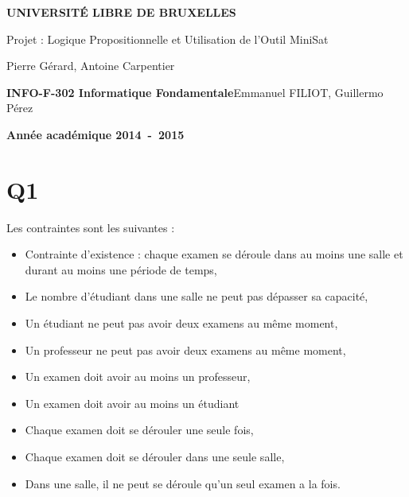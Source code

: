 \documentclass[a4paper,11pt]{article}
\begin{document}
\begin{titlepage}
\begin{center}
\textbf{\textsc{UNIVERSIT\'E LIBRE DE BRUXELLES}}\\
\vfill{}\vfill{}
\begin{center}{\Huge Projet : Logique Propositionnelle et Utilisation de l’Outil MiniSat}\end{center}{\Huge \par}
\begin{center}{\large Pierre Gérard, Antoine Carpentier}\end{center}{\Huge \par}
\vfill{}\vfill{} \vfill{}
\begin{flushleft}{\large \textbf{INFO-F-302 Informatique Fondamentale}}\hfill{Emmanuel FILIOT, Guillermo Pérez}\end{flushleft}{\large\par}
\vfill{}\vfill{}\enlargethispage{3cm}
\textbf{Année académique 2014~-~2015}
\end{center}
\end{titlepage}



\tableofcontents

\pagebreak


\section{Q1}
Les contraintes sont les suivantes :
\begin{itemize}
  \item Contrainte d'existence : chaque examen se déroule dans au moins une salle et durant au moins une période de temps,
  \item Le nombre d'étudiant dans une salle ne peut pas dépasser sa capacité,
  \item Un étudiant ne peut pas avoir deux examens au même moment,
  \item Un professeur ne peut pas avoir deux examens au même moment,
  \item Un examen doit avoir au moins un professeur,
  \item Un examen doit avoir au moins un étudiant
  \item Chaque examen doit se dérouler une seule fois,
  \item Chaque examen doit se dérouler dans une seule salle,
  \item Dans une salle, il ne peut se déroule qu'un seul examen a la fois.
\end{itemize}
\end{document}
